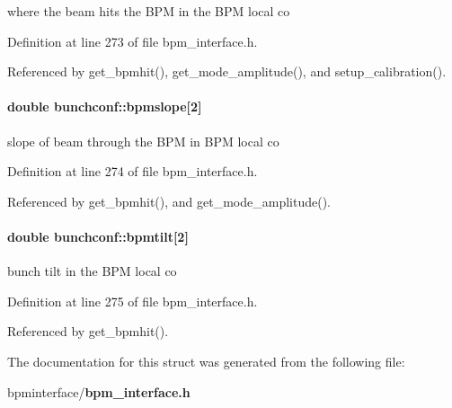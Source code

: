 where the beam hits the BPM in the BPM local co 

Definition at line 273 of file bpm\_\-interface.h.

Referenced by get\_\-bpmhit(), get\_\-mode\_\-amplitude(), and setup\_\-calibration().
\paragraph[bpmslope]{\setlength{\rightskip}{0pt plus 5cm}double {\bf bunchconf::bpmslope}[2]}\hfill\label{structbunchconf_97cf9b9382c9b00b163ec51f00593bf1}


slope of beam through the BPM in BPM local co 

Definition at line 274 of file bpm\_\-interface.h.

Referenced by get\_\-bpmhit(), and get\_\-mode\_\-amplitude().
\paragraph[bpmtilt]{\setlength{\rightskip}{0pt plus 5cm}double {\bf bunchconf::bpmtilt}[2]}\hfill\label{structbunchconf_02a745532d1169ab016f2c6ded81938c}


bunch tilt in the BPM local co 

Definition at line 275 of file bpm\_\-interface.h.

Referenced by get\_\-bpmhit().

The documentation for this struct was generated from the following file:\begin{CompactItemize}
\item 
bpminterface/{\bf bpm\_\-interface.h}\end{CompactItemize}
